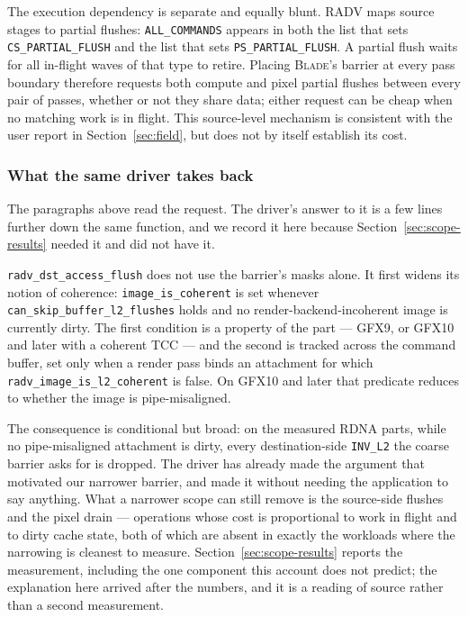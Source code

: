 \documentclass[10pt,twocolumn]{article}
\newcommand{\blade}{\textsc{Blade}}
\begin{document}
The execution dependency is separate and equally blunt. RADV maps source
stages to partial flushes: \texttt{ALL\_COMMANDS} appears in both the list that
sets \texttt{CS\_PARTIAL\_FLUSH} and the list that sets
\texttt{PS\_PARTIAL\_FLUSH}. A partial flush waits for all in-flight waves of
that type to retire. Placing \blade's barrier at every pass boundary therefore
requests both compute and pixel partial flushes between every pair of passes,
whether or not they share data; either request can be cheap when no matching
work is in flight. This source-level mechanism is consistent with the user
report in Section~\ref{sec:field}, but does not by itself establish its cost.

\subsubsection{What the same driver takes back}
\label{sec:radv-elision}

The paragraphs above read the request. The driver's answer to it is a few lines
further down the same function, and we record it here because
Section~\ref{sec:scope-results} needed it and did not have it.

\texttt{radv\_dst\_access\_flush} does not use the barrier's masks alone. It
first widens its notion of coherence:
\texttt{image\_is\_coherent} is set whenever
\texttt{can\_skip\_buffer\_l2\_flushes} holds and no render-backend-incoherent
image is currently dirty. The first condition is a property of the part ---
GFX9, or GFX10 and later with a coherent TCC --- and the second is tracked
across the command buffer, set only when a render pass binds an attachment for
which \texttt{radv\_image\_is\_l2\_coherent} is false. On GFX10 and later that
predicate reduces to whether the image is pipe-misaligned.

The consequence is conditional but broad: on the measured RDNA parts, while no
pipe-misaligned attachment is dirty, every destination-side
\texttt{INV\_L2} the coarse barrier asks for is dropped. The
driver has already made the argument that motivated our narrower barrier, and
made it without needing the application to say anything. What a narrower scope
can still remove is the source-side flushes and the pixel drain --- operations
whose cost is proportional to work in flight and to dirty cache state, both of
which are absent in exactly the workloads where the narrowing is cleanest to
measure. Section~\ref{sec:scope-results} reports the measurement, including
the one component this account does not predict; the explanation here arrived
after the numbers, and it is a reading of source rather than a second
measurement.
\end{document}
